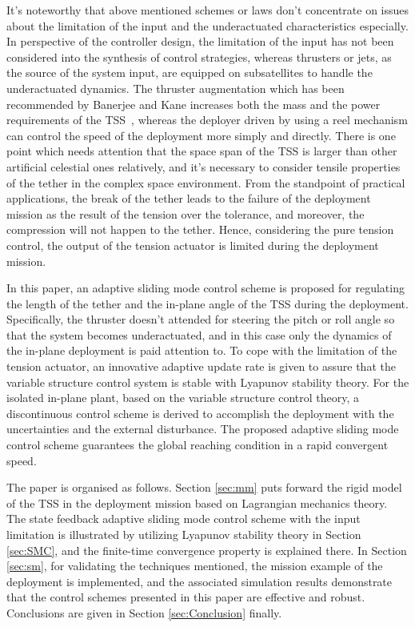 \documentclass[3p]{elsarticle}
\theoremstyle{plain}
\begin{document}
It's noteworthy that above mentioned schemes or laws don't concentrate on issues about the limitation of the input and the underactuated characteristics especially. In perspective of the controller design, the limitation of the input has not been considered into the synthesis of control strategies, whereas thrusters or jets, as the source of the system input, are equipped on subsatellites to handle the underactuated dynamics. The thruster augmentation which has been recommended by Banerjee and Kane increases both the mass and the power requirements of the TSS~\cite{banerjee1984tethered}, whereas the deployer driven by using a reel mechanism can control the speed of the deployment more simply and directly. There is one point which needs attention that the space span of the TSS is larger than other artificial celestial ones relatively, and it's necessary to consider tensile properties of the tether in the complex space environment. From the standpoint of practical applications, the break of the tether leads to the failure of the deployment mission as the result of the tension over the tolerance, and moreover, the compression will not happen to the tether. Hence, considering the pure tension control, the output of the tension actuator is limited during the deployment mission.\par
In this paper, an adaptive sliding mode control scheme is proposed for regulating the length of the tether and the in-plane angle of the TSS during the deployment. Specifically, the thruster doesn't attended for steering the pitch or roll angle so that the system becomes underactuated, and in this case only the dynamics of the in-plane deployment is paid attention to. To cope with the limitation of the tension actuator, an innovative adaptive update rate is given to assure that the variable structure control system is stable with Lyapunov stability theory. For the isolated in-plane plant, based on the variable structure control theory, a discontinuous control scheme is derived to accomplish the deployment with the uncertainties and the external disturbance. The proposed adaptive sliding mode control scheme guarantees the global reaching condition in a rapid convergent speed.\par
The paper is organised as follows. Section \ref{sec:mm} puts forward the rigid model of the TSS in the deployment mission based on Lagrangian mechanics theory. The state feedback adaptive sliding mode control scheme with the input limitation is illustrated by utilizing Lyapunov stability theory in Section \ref{sec:SMC}, and the finite-time convergence property is explained there. In Section \ref{sec:sm}, for validating the techniques mentioned, the mission example of the deployment is implemented, and the associated simulation results demonstrate that the control schemes presented in this paper are effective and robust. Conclusions are given in Section \ref{sec:Conclusion} finally.
\end{document}
